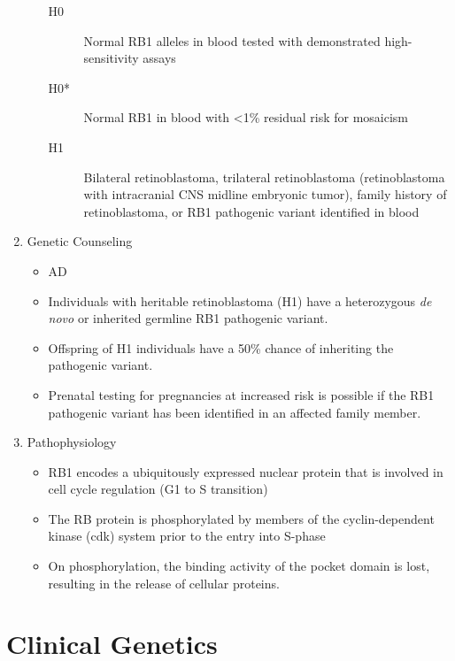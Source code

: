 \documentclass[12pt]{scrartcl}
\begin{document}
\begin{enumerate}
\begin{itemize}
\begin{description}
\item[{H0}] Normal RB1 alleles in blood tested with demonstrated
high-sensitivity assays

\item[{H0*}] Normal RB1 in blood with <1\% residual risk for mosaicism

\item[{H1}] Bilateral retinoblastoma, trilateral retinoblastoma
(retinoblastoma with intracranial CNS midline embryonic
tumor), family history of retinoblastoma, or RB1 pathogenic
variant identified in blood
\end{description}
\end{itemize}

\item Genetic Counseling
\label{sec:org51fe082}
\begin{itemize}
\item AD
\item Individuals with heritable retinoblastoma (H1) have a heterozygous
\emph{de novo} or inherited germline RB1 pathogenic variant.
\item Offspring of H1 individuals have a 50\% chance of inheriting the
pathogenic variant.
\item Prenatal testing for pregnancies at increased risk is possible if
the RB1 pathogenic variant has been identified in an affected family
member.
\end{itemize}

\item Pathophysiology
\label{sec:org3f7c67f}
\begin{itemize}
\item RB1 encodes a ubiquitously expressed nuclear protein that is
involved in cell cycle regulation (G1 to S transition)
\item The RB protein is phosphorylated by members of the cyclin-dependent kinase
(cdk) system prior to the entry into S-phase
\item On phosphorylation, the binding activity of the pocket domain is
lost, resulting in the release of cellular proteins.
\end{itemize}
\end{enumerate}

\section{Clinical Genetics}
\label{sec:org306bcce}
\end{document}

